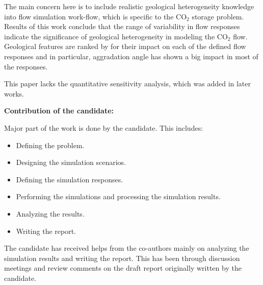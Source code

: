 {The main concern here is to include realistic geological heterogeneity knowledge
into flow simulation work-flow, which is specific to the $\mbox{CO}_2$ storage
problem. Results of this work conclude that the range of variability in flow
responses indicate the significance of geological heterogeneity in modeling the
$\mbox{CO}_2$ flow. Geological features are ranked by for their impact on each
of the defined flow responses and in particular, aggradation angle has shown a
big impact in most of the responses.

This paper lacks the quantitative sensitivity analysis, which was added in later works. 

\vspace{0.5cm}
\noindent\textbf{Contribution of the candidate:}

Major part of the work is done by the candidate. This includes:
\begin{itemize}
\item Defining the problem.
\item Designing the simulation scenarios.
\item Defining the simulation responses.
\item Performing the simulations  and processing the simulation results.
\item Analyzing the results.
\item Writing the report.
\end{itemize}

The candidate has received helps from the co-authors mainly on analyzing the simulation  results and writing the report. This has been through discussion meetings and review comments on the draft report originally written by the candidate. 
}%


